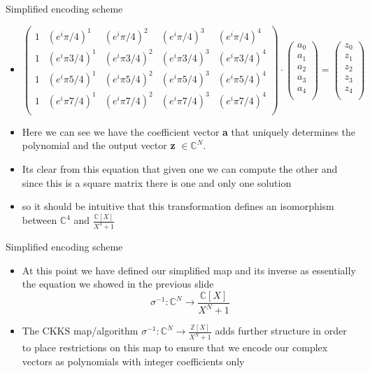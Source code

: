 \documentclass{beamer}
\begin{document}
\begin{frame}{Simplified encoding scheme}
	\begin{itemize}[<+->]
	\item 
		\begin{center}
			\[
			\begin{pmatrix}
				1 & (e^i\pi/4)^1 &  (e^i\pi/4)^2 &  (e^i\pi/4)^3 & (e^i\pi/4)^4\\  
				1 & (e^i\pi 3/4)^1 &  (e^i\pi 3/4)^2 &  (e^i\pi 3/4)^3 & (e^i\pi 3/4)^4\\  
				1 & (e^i\pi 5/4)^1 &  (e^i\pi 5/4)^2 &  (e^i\pi 5/4)^3 & (e^i\pi 5/4)^4\\  
				1 & (e^i\pi 7/4)^1 &  (e^i\pi 7/4)^2 &  (e^i\pi 7/4)^3 & (e^i\pi 7/4)^4\\  
			\end{pmatrix} \cdot 
			\begin{pmatrix}
				a_0\\
				a_1\\
				a_2\\
				a_3\\
				a_4\\
			\end{pmatrix} =
			\begin{pmatrix}
				z_0\\
				z_1\\
				z_2\\
				z_3\\
				z_4\\
			\end{pmatrix}
			\]
		\end{center}
		\item Here we can see we have the coefficient vector {\bf a} that uniquely determines the polynomial
		and the output vector {\bf z} $\in \mathbb{C}^N$. 
		\item Its clear from this equation that given one we can compute the other
		and since this is a square matrix there is one and only one solution
		\item so it should be intuitive that this transformation defines an isomorphism between $\mathbb{C}^4$ and $\frac{\mathbb{C}[X]}{X^4 + 1}$
	\end{itemize}
\end{frame}

\begin{frame}{Simplified encoding scheme}
	\begin{itemize}[<+->]
		\item At this point we have defined our simplified map and its inverse as essentially the equation we showed
		in the previous slide
		$$\sigma^{-1} : \mathbb{C}^N \to \frac{\mathbb{C}[X]}{X^N + 1}$$
		\item The CKKS map/algorithm $\sigma^{-1} : \mathbb{C}^N \to \frac{\mathbb{Z}[X]}{X^N + 1}$ adds further structure
		in order to place restrictions on this map to ensure that we encode our complex vectors as polynomials with
		integer coefficients only
	\end{itemize}
\end{frame}
\end{document}
